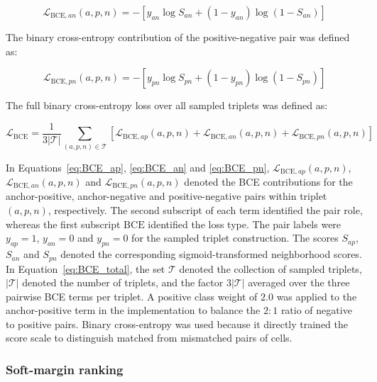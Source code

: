 \documentclass[11pt]{article}
\begin{document}
\begin{equation}
\mathcal{L}_{\mathrm{BCE},an}(a,p,n)=
-
\left[
y_{an}\log S_{an}
+
(1-y_{an})\log(1-S_{an})
\right]
  \label{eq:BCE_an}
\end{equation}

The binary cross-entropy contribution of the positive-negative pair was defined as:

\begin{equation}
\mathcal{L}_{\mathrm{BCE},pn}(a,p,n)=
-
\left[
y_{pn}\log S_{pn}
+
(1-y_{pn})\log(1-S_{pn})
\right]
  \label{eq:BCE_pn}
\end{equation}

The full binary cross-entropy loss over all sampled triplets was defined as:

\begin{equation}
\mathcal{L}_{\mathrm{BCE}}=
\frac{1}{3|\mathcal{T}|}
\sum_{(a,p,n)\in\mathcal{T}}
\left[
\mathcal{L}_{\mathrm{BCE},ap}(a,p,n)
+
\mathcal{L}_{\mathrm{BCE},an}(a,p,n)
+
\mathcal{L}_{\mathrm{BCE},pn}(a,p,n)
\right]
  \label{eq:BCE_total}
\end{equation}

In Equations~\ref{eq:BCE_ap}, \ref{eq:BCE_an} and \ref{eq:BCE_pn}, \(\mathcal{L}_{\mathrm{BCE},ap}(a,p,n)\), \(\mathcal{L}_{\mathrm{BCE},an}(a,p,n)\) and \(\mathcal{L}_{\mathrm{BCE},pn}(a,p,n)\) denoted the BCE contributions for the anchor-positive, anchor-negative and positive-negative pairs within triplet \((a,p,n)\), respectively. The second subscript of each term identified the pair role, whereas the first subscript \(\mathrm{BCE}\) identified the loss type. The pair labels were \(y_{ap}=1\), \(y_{an}=0\) and \(y_{pn}=0\) for the sampled triplet construction. The scores \(S_{ap}\), \(S_{an}\) and \(S_{pn}\) denoted the corresponding sigmoid-transformed neighborhood scores. In Equation~\ref{eq:BCE_total}, the set \(\mathcal{T}\) denoted the collection of sampled triplets, \(|\mathcal{T}|\) denoted the number of triplets, and the factor \(3|\mathcal{T}|\) averaged over the three pairwise BCE terms per triplet. A positive class weight of $2.0$ was applied to the anchor-positive term in the implementation to balance the $2\!:\!1$ ratio of negative to positive pairs. Binary cross-entropy was used because it directly trained the score scale to distinguish matched from mismatched pairs of cells.

\subsubsection*{Soft-margin ranking}
\end{document}
